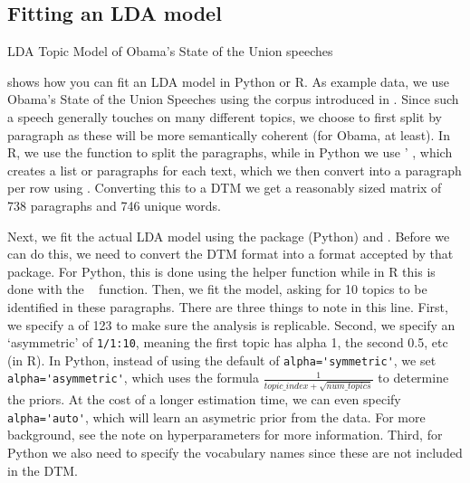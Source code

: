 \subsection{Fitting an LDA model}


\begin{ccsexample}
\caption{LDA Topic Model of Obama's State of the Union speeches}\label{ex:lda}
\end{ccsexample}

 shows how you can fit an LDA model in Python or R.
As example data, we use Obama's State of the Union Speeches using the corpus introduced in .
Since such a speech generally touches on many different topics, we choose to first split by paragraph
as these will be more semantically coherent (for Obama, at least).
In R, we use the  function to split the paragraphs,
while in Python we use \pandas' , which creates a list or paragraphs for each text,
which we then convert into a paragraph per row using .
Converting this to a DTM we get a reasonably sized matrix of 738 paragraphs and 746 unique words.

Next, we fit the actual LDA model using the package  (Python) and .
Before we can do this, we need to convert the DTM format into a format accepted by that package.
For Python, this is done using the  helper function while in R this is done with the \quanteda\  function.
Then, we fit the model, asking for 10 topics to be identified in these paragraphs.
There are three things to note in this line.
First, we specify a  of 123 to make sure the analysis is replicable.
Second, we specify an `asymmetric' of \verb|1/1:10|, meaning the first topic has alpha 1, the second 0.5, etc (in R).
In Python, instead  of using the default of \verb|alpha='symmetric'|, we set  \verb|alpha='asymmetric'|, which uses the formula
$\frac{1}{topic\_index + \sqrt{num\_topics}}$ to determine the priors. At the cost of a longer estimation time, we can even
specify \verb|alpha='auto'|, which will learn an asymetric prior from the data. For more background, see the note on hyperparameters for more information. 
Third, for Python we also need to specify the vocabulary names since these are not included in the DTM.

